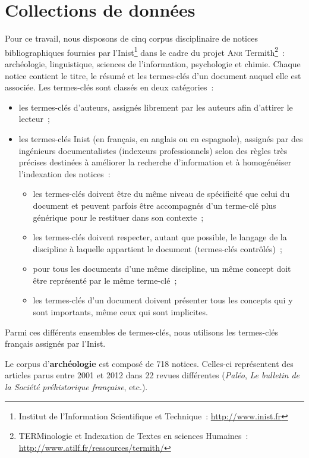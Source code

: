 \section{Collections de données}
\label{sec:presentation_des_donnees}
  Pour ce travail, nous disposons de cinq corpus disciplinaire de notices
  bibliographiques fournies par l'Inist\footnote{Institut de l'Information
  Scientifique et Technique~: \url{http://www.inist.fr}} dans le cadre du projet
  \textsc{Anr} Termith\footnote{TERMinologie et Indexation de Textes en sciences
  Humaines~: \url{http://www.atilf.fr/ressources/termith/}}~: archéologie,
  linguistique, sciences de l'information, psychologie et chimie. Chaque notice
  contient le titre, le résumé et les termes-clés d'un document auquel elle est
  associée. Les termes-clés sont classés en deux catégories~:
  \begin{itemize}
    \item{les termes-clés d'auteurs, assignés librement par les auteurs afin
          d'attirer le lecteur~;}
    \item{les termes-clés Inist (en français, en anglais ou en espagnole),
          assignés par des ingénieurs documentalistes (indexeurs professionnels)
          selon des règles très précises destinées à améliorer la recherche
          d'information et à homogénéiser l'indexation des notices~:}
    \begin{itemize}
      \item{les termes-clés doivent être du même niveau de spécificité que celui
            du document et peuvent parfois être accompagnés d'un terme-clé plus
            générique pour le restituer dans son contexte~;}
      \item{les termes-clés doivent respecter, autant que possible, le langage
            de la discipline à laquelle appartient le document (termes-clés
            contrôlés)~;}
      \item{pour tous les documents d'une même discipline, un même concept doit
            être représenté par le même terme-clé~;}
      \item{les termes-clés d'un document doivent présenter tous les concepts
            qui y sont importants, même ceux qui sont implicites.}
    \end{itemize}
  \end{itemize}
  Parmi ces différents ensembles de termes-clés, nous utilisons les termes-clés
  français assignés par l'Inist.

  Le corpus d'\textbf{archéologie} est composé de 718 notices. Celles-ci
  représentent des articles parus entre 2001 et 2012 dans 22 revues différentes
  (\textit{Paléo}, \textit{Le bulletin de la Société préhistorique française},
  etc.).

